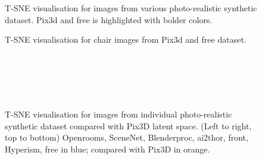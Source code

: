 \begin{figure}
    \centering
    \resizebox{\textwidth}{!}{}
    \caption{T-SNE visualisation for images from various photo-realistic synthetic dataset. Pix3d and \gls{free} is highlighted with bolder colors.}
    \label{fig:photorealistic tsne}
\end{figure}

\begin{figure}
    \centering
    \resizebox{\textwidth}{!}{}
    \caption{T-SNE visualisation for chair images from Pix3d and \gls{free} dataset.}
    \label{fig:pix3d_s2r3dfree}
\end{figure}

\begin{figure}[!ht]
    \centering
    \resizebox{0.49\linewidth}{5cm}{}
    \resizebox{0.49\linewidth}{5cm}{}\\
    \resizebox{0.49\linewidth}{5cm}{}
    \resizebox{0.49\linewidth}{5cm}{}\\
    \resizebox{0.49\linewidth}{5cm}{}
    \resizebox{0.49\linewidth}{5cm}{}\\
    \resizebox{0.49\linewidth}{5cm}{}\\

    \caption{T-SNE visualisation for images from individual photo-realistic synthetic dataset compared with Pix3D latent space.
        (Left to right, top to bottom) Openrooms, SceneNet, Blenderproc, \gls{ai2thor}, \gls{front}, Hyperism, \gls{free} in blue;
        compared with Pix3D in orange.}
    \label{fig:tsne per dataset}
\end{figure}


